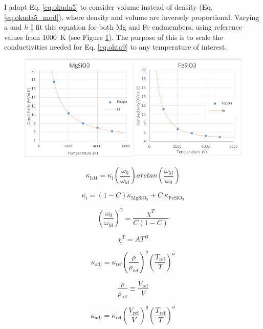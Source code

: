 I adapt Eq. \ref{eq.okuda5} to consider volume instead of density (Eq. \ref{eq.okuda5_mod}), where density and volume are inversely proportional. Varying $a$ and $h$ I fit this equation for both Mg and Fe endmembers, using reference values from 1000~K (see Figure \ref{fig:draft_kt}). The purpose of this is to scale the conductivities needed for Eq. \ref{eq.ohta9} to any temperature of interest.

\begin{figure}[h]
  \includegraphics[width=\linewidth]{Figures/draft_kT.png}
  \caption{}
  \label{fig:draft_kt}
\end{figure}



\pagebreak






$$\kappa_{\mathrm{latt}}=\kappa_{\mathrm{i}}\left ( \frac{\omega_{\mathrm{0}}}{\omega_{\mathrm{M}}} \right )arctan\left ( \frac{\omega_{\mathrm{M}}}{\omega_{\mathrm{0}}} \right )$$

$$\kappa_{\mathrm{i}}=\left ( 1-C \right )\kappa_{\mathrm{MgSiO_{3}}}+C\ \kappa_{\mathrm{FeSiO_{3}}}$$

$$\left ( \frac{\omega_{\mathrm{0}}}{\omega_{\mathrm{M}}} \right )^{2}=\frac{\chi^{T}}{C\left ( 1-C \right )}$$

$$\chi^{T}=A T^{B}$$

$$\kappa_{\mathrm{adj}}=\kappa_{\mathrm{ref}}\left ( \frac{\rho}{\rho_{\mathrm{ref}}} \right )^{g}\left ( \frac{T_{\mathrm{ref}}}{T} \right )^{a}$$

$$\frac{\rho }{\rho _{\mathrm{ref}}} \equiv \frac{V_{\mathrm{ref}}}{V}$$%

$$\kappa_{\mathrm{adj}}=\kappa_{\mathrm{ref}}\left ( \frac{V_{\mathrm{ref}}}{V} \right )^{g}\left ( \frac{T_{\mathrm{ref}}}{T} \right )^{a}$$

